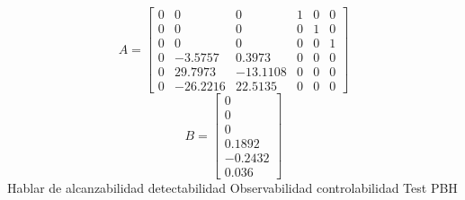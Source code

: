 \begin{equation}
 A = \begin{bmatrix}
0 &  0 & 0 & 1 &  0 & 0\\
0 &  0 & 0 & 0 &  1 & 0\\
0 &  0 & 0 & 0 &  0 & 1\\
0 &  -3.5757 & 0.3973 & 0 &  0 & 0\\
0 &  29.7973 & -13.1108 & 0 &  0 & 0\\
0 &  -26.2216 & 22.5135 & 0 &  0 & 0
\end{bmatrix}
\end{equation}
\begin{equation}
 B = \begin{bmatrix}
0 \\
0 \\
0 \\
0.1892 \\
-0.2432 \\
0.036 
\end{bmatrix}
\end{equation}
Hablar de alcanzabilidad detectabilidad
Observabilidad controlabilidad 
Test PBH
%